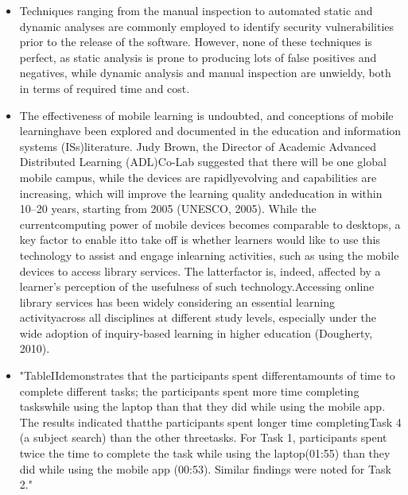     \begin{itemize}
        
        \item 
        Techniques ranging from the manual inspection to
        automated static and dynamic analyses are commonly employed to
        identify security vulnerabilities prior to the release of the software.
        However, none of these techniques is perfect, as static analysis is
        prone to producing lots of false positives and negatives, while dynamic analysis and manual inspection are unwieldy, both in terms
        of required time and cost. \cite{MiningMobileApp}
        
        \item
        The effectiveness of mobile learning is undoubted, and conceptions of mobile learninghave been explored and documented in the education and information systems (ISs)literature. Judy Brown, the Director of Academic Advanced Distributed Learning (ADL)Co-Lab suggested that there will be one global mobile campus, while the devices are rapidlyevolving and capabilities are increasing, which will improve the learning quality andeducation in within 10–20 years, starting from 2005 (UNESCO, 2005). While the currentcomputing power of mobile devices becomes comparable to desktops, a key factor to enable itto take off is whether learners would like to use this technology to assist and engage inlearning activities, such as using the mobile devices to access library services. The latterfactor is, indeed, affected by a learner’s perception of the usefulness of such technology.Accessing online library services has been widely considering an essential learning activityacross all disciplines at different study levels, especially under the wide adoption of inquiry-based learning in higher education (Dougherty, 2010). \cite{Mobile_Apps_Between_Hong_Kong_and_Japan}
        
        \item 
        "TableIIdemonstrates that the participants spent differentamounts of time to complete different tasks; the participants spent more time completing taskswhile using the laptop than that they did while using the mobile app. The results indicated thatthe participants spent longer time completingTask 4 (a subject search) than the other threetasks. For Task 1, participants spent twice the time to complete the task while using the laptop(01:55) than they did while using the mobile app (00:53). Similar findings were noted for Task 2." \cite{given_one}
    \end{itemize}
    
